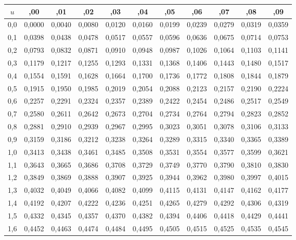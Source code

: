 \documentclass[12pt,a4paper]{article}
\begin{document}
\begin{center}
\footnotesize
\begin{tabular*}{\linewidth}{@{\extracolsep{\fill}}ccccccccccc@{}}
\toprule
$u$ & ,00 & ,01 & ,02 & ,03 & ,04 & ,05 & ,06 & ,07 & ,08 & ,09 \\
\midrule
0,0 & 0,0000 & 0,0040 & 0,0080 & 0,0120 & 0,0160 & 0,0199 & 0,0239 & 0,0279 & 0,0319 & 0,0359 \\
0,1 & 0,0398 & 0,0438 & 0,0478 & 0,0517 & 0,0557 & 0,0596 & 0,0636 & 0,0675 & 0,0714 & 0,0753 \\
0,2 & 0,0793 & 0,0832 & 0,0871 & 0,0910 & 0,0948 & 0,0987 & 0,1026 & 0,1064 & 0,1103 & 0,1141 \\
0,3 & 0,1179 & 0,1217 & 0,1255 & 0,1293 & 0,1331 & 0,1368 & 0,1406 & 0,1443 & 0,1480 & 0,1517 \\
0,4 & 0,1554 & 0,1591 & 0,1628 & 0,1664 & 0,1700 & 0,1736 & 0,1772 & 0,1808 & 0,1844 & 0,1879 \\
0,5 & 0,1915 & 0,1950 & 0,1985 & 0,2019 & 0,2054 & 0,2088 & 0,2123 & 0,2157 & 0,2190 & 0,2224 \\
0,6 & 0,2257 & 0,2291 & 0,2324 & 0,2357 & 0,2389 & 0,2422 & 0,2454 & 0,2486 & 0,2517 & 0,2549 \\
0,7 & 0,2580 & 0,2611 & 0,2642 & 0,2673 & 0,2704 & 0,2734 & 0,2764 & 0,2794 & 0,2823 & 0,2852 \\
0,8 & 0,2881 & 0,2910 & 0,2939 & 0,2967 & 0,2995 & 0,3023 & 0,3051 & 0,3078 & 0,3106 & 0,3133 \\
0,9 & 0,3159 & 0,3186 & 0,3212 & 0,3238 & 0,3264 & 0,3289 & 0,3315 & 0,3340 & 0,3365 & 0,3389 \\
1,0 & 0,3413 & 0,3438 & 0,3461 & 0,3485 & 0,3508 & 0,3531 & 0,3554 & 0,3577 & 0,3599 & 0,3621 \\
1,1 & 0,3643 & 0,3665 & 0,3686 & 0,3708 & 0,3729 & 0,3749 & 0,3770 & 0,3790 & 0,3810 & 0,3830 \\
1,2 & 0,3849 & 0,3869 & 0,3888 & 0,3907 & 0,3925 & 0,3944 & 0,3962 & 0,3980 & 0,3997 & 0,4015 \\
1,3 & 0,4032 & 0,4049 & 0,4066 & 0,4082 & 0,4099 & 0,4115 & 0,4131 & 0,4147 & 0,4162 & 0,4177 \\
1,4 & 0,4192 & 0,4207 & 0,4222 & 0,4236 & 0,4251 & 0,4265 & 0,4279 & 0,4292 & 0,4306 & 0,4319 \\
1,5 & 0,4332 & 0,4345 & 0,4357 & 0,4370 & 0,4382 & 0,4394 & 0,4406 & 0,4418 & 0,4429 & 0,4441 \\
1,6 & 0,4452 & 0,4463 & 0,4474 & 0,4484 & 0,4495 & 0,4505 & 0,4515 & 0,4525 & 0,4535 & 0,4545 \\

\end{tabular*}
\end{center}
\end{document}
